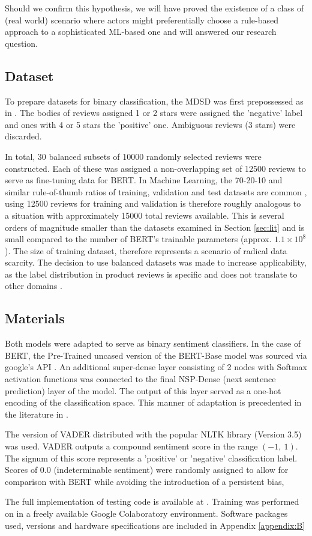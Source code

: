 \documentclass{csfourzero}
\begin{document}
Should we confirm this hypothesis, we will have proved the existence of a class of (real world) scenario where actors might preferentially choose a rule-based approach to a sophisticated ML-based one and will answered our research question.

\subsection{Dataset}

To prepare datasets for binary classification, the MDSD was first prepossessed as in \cite{domainadaptation}. The bodies of reviews assigned 1 or 2 stars were assigned the 'negative' label and ones with 4 or 5 stars the 'positive' one. Ambiguous reviews (3 stars) were discarded.
\par
In total, 30 balanced subsets of 10000 randomly selected reviews were constructed. Each of these was assigned a non-overlapping set of 12500 reviews to serve as fine-tuning data for BERT. In Machine Learning, the 70-20-10 and similar rule-of-thumb ratios of training, validation and test datasets are common \cite{testvalsplit}, using 12500 reviews for training and validation is therefore roughly analogous to a situation with approximately 15000 total reviews available. This is several orders of magnitude smaller than the datasets examined in Section \ref{sec:lit} and is small compared to the number of BERT's trainable parameters (approx. $1.1 \times 10^8$). The size of training dataset, therefore represents a scenario of radical data scarcity. The decision to use balanced datasets was made to increase applicability, as the label distribution in product reviews is specific and does not translate to other domains \cite{jshapedreviews}.

\subsection{Materials}

Both models were adapted to serve as binary sentiment classifiers. In the case of BERT, the Pre-Trained uncased version of the BERT-Base model was sourced via google's API \cite{bertavailable}. An additional super-dense layer consisting of 2 nodes with Softmax activation functions was connected to the final NSP-Dense (next sentence prediction) layer of the model. The output of this layer served as a one-hot encoding of the classification space. This manner of adaptation is precedented in the literature in \cite{bertAdaptation}.
\par
The version of VADER distributed with the popular NLTK library (Version 3.5) \cite{NLTKoriginalpaper} was used. VADER outputs a compound sentiment score in the range $(-1,\ 1)$. The signum of this score represents a 'positive' or 'negative' classification label. Scores of 0.0 (indeterminable sentiment) were randomly assigned to allow for comparison with BERT while avoiding the introduction of a persistent bias, 
\par
The full implementation of testing code is available at \cite{GITBUB}. Training was performed on in a freely available Google Colaboratory environment. Software packages used, versions and hardware specifications are included in Appendix \ref{appendix:B}
\end{document}
